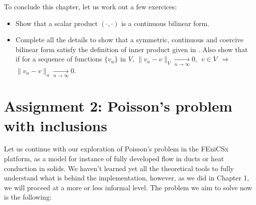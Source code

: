 To conclude this chapter, let us work out a few exercices:

\begin{kaobox}[frametitle=Solve the following exercices]
\begin{itemize}
\item Show that a scalar product $(\cdot,\cdot)$ is a continuous bilinear 
form.\\

\item Complete all the details to show that a symmetric, continuous
and coercive bilinear form satisfy the definition of inner product
given in . Also show that if for a sequence of functions $\{v_n\}$ in
$V$, $\lVert v_n - v\rVert_V \xrightarrow[n\rightarrow \infty]{} 0,~~v\in V ~~\Rightarrow~~$
$\lVert v_n - v\rVert_a \xrightarrow[n\rightarrow \infty]{} 0$.

\end{itemize}
\end{kaobox}

\section{{\color{gray!50!green} Assignment 2: Poisson's problem with inclusions}}

Let us continue with our exploration of Poisson's problem in the FEniCSx platform,
as a model for instance of fully developed flow in ducts or heat conduction in solids.
We haven't learned yet all the theoretical tools to fully understand what is
behind the implementation, however, as we did in Chapter 1, we will proceed at a
more or less informal level. The problem we aim to solve now is the following:

